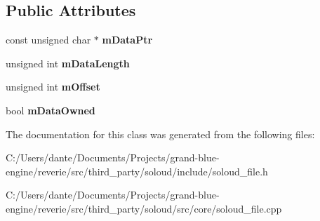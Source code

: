 \subsection*{Public Attributes}
\begin{DoxyCompactItemize}
\item 
\mbox{\label{class_so_loud_1_1_memory_file_a43555392010651579552e69aa5339420}} 
const unsigned char $\ast$ {\bfseries m\+Data\+Ptr}
\item 
\mbox{\label{class_so_loud_1_1_memory_file_ab407b1a28480fb1e7526f4fbaaeeafd0}} 
unsigned int {\bfseries m\+Data\+Length}
\item 
\mbox{\label{class_so_loud_1_1_memory_file_a20c583c361b6564bea362c6a9a1e7682}} 
unsigned int {\bfseries m\+Offset}
\item 
\mbox{\label{class_so_loud_1_1_memory_file_a2ee4bfc90fa42f79f78f3663c446b6db}} 
bool {\bfseries m\+Data\+Owned}
\end{DoxyCompactItemize}


The documentation for this class was generated from the following files\+:\begin{DoxyCompactItemize}
\item 
C\+:/\+Users/dante/\+Documents/\+Projects/grand-\/blue-\/engine/reverie/src/third\+\_\+party/soloud/include/soloud\+\_\+file.\+h\item 
C\+:/\+Users/dante/\+Documents/\+Projects/grand-\/blue-\/engine/reverie/src/third\+\_\+party/soloud/src/core/soloud\+\_\+file.\+cpp\end{DoxyCompactItemize}
